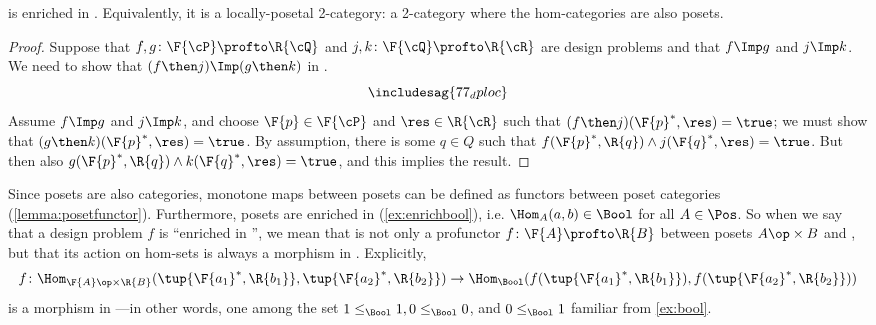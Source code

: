 \begin{proposition}
    \label{prop:DP_loc_pos}
    \DP is enriched in \Pos. Equivalently, it is a locally-posetal 2-category: a 2-category where the hom-categories are also posets.
\end{proposition}
\begin{proof}
    Suppose that $f,g\colon \F{\cP} \profto \R{\cQ}$ and $j,k\colon \F{\cQ} \profto \R{\cR}$ are design problems and that $f\Imp g$ and $j\Imp k$. We need to show that $(f\then j)\Imp(g\then k)$ in \DP.
    \begin{equation}
        \includesag{77_dploc}
    \end{equation}
    Assume $f\Imp g$ and $j\Imp k$, and choose $\F{p}\in\F{\cP} $ and $\res\in\R{\cR}$ such that $(f\then j)(\F{p}^*,\res)=\true$; we must show that $(g \then k)(\F{p}^*,\res)=\true$. By assumption, there is some $q\in Q$ such that $f(\F{p}^*,\R{q})\wedge j(\F{q}^*,\res)=\true$. But then also $g(\F{p}^*,\R{q})\wedge k(\F{q}^*,\res)=\true$, and this implies the result.
\end{proof}

Since posets are also categories, monotone maps between posets can be defined as functors between poset categories (\cref{lemma:posetfunctor}). Furthermore, posets are enriched in \Bool (\cref{ex:enrichbool}), i.e. $\Hom_A(a,b) \in \Bool$ for all $A \in \Pos$. So when we say that a design problem $f$ is ``enriched in \Bool'', we mean that is not only a profunctor $f \colon \F{A} \profto \R{B}$ between posets $A\op \times B$ and \Bool, but that its action on hom-sets is always a morphism in \Bool. Explicitly,
\begin{equation}
    f \colon \Hom_{\F{A}\op \times \R{B}}(\tup{\F{a_1}^*,\R{b_1}}, \tup{\F{a_2}^*,\R{b_2}}) \to \Hom_\Bool(f(\tup{\F{a_1}^*,\R{b_1}}), f(\tup{\F{a_2}^*,\R{b_2}}))
\end{equation}
is a morphism in \Bool---in other words, one among the set $1 \leq_\Bool 1, 0 \leq_\Bool 0$, and $0 \leq_\Bool 1$ familiar from \cref{ex:bool}.

